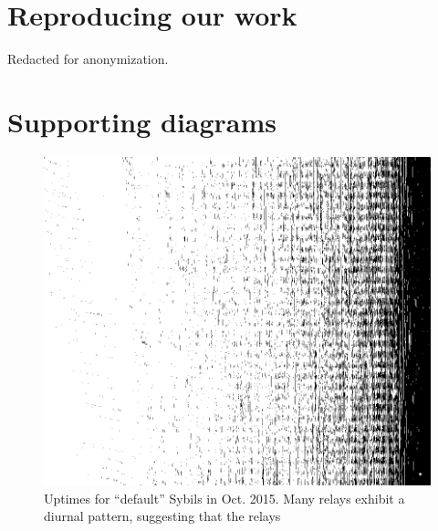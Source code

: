 \appendix

\section{Reproducing our work}
Redacted for anonymization.

\section{Supporting diagrams}

\begin{figure}[t]
	\centering
	\includegraphics[width=\linewidth]{diagrams/default-sybils-2015-10.jpg}
	\caption{Uptimes for ``default'' Sybils in Oct. 2015.  Many relays exhibit a
	diurnal pattern, suggesting that the relays }
	\label{fig:default-sybils-uptime}
\end{figure}
